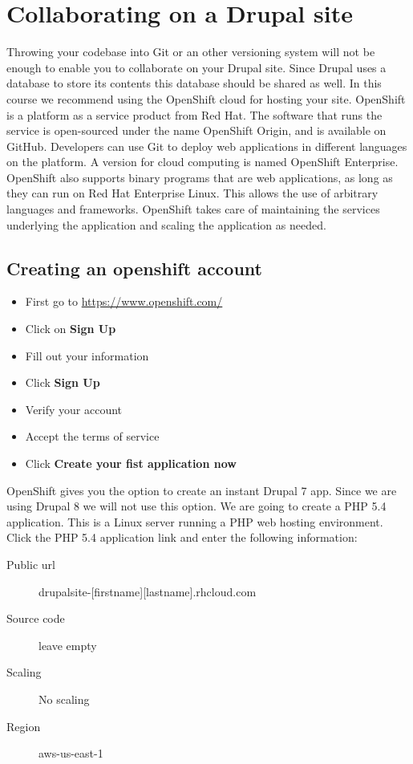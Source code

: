 \chapter{Collaborating on a Drupal site}

Throwing your codebase into Git or an other versioning system will not be enough to enable you to collaborate on your Drupal site. Since Drupal uses a database to store its contents this database should be shared as well. In this course we recommend using the OpenShift cloud for hosting your site.
OpenShift is a platform as a service product from Red Hat. The software that runs the service is open-sourced under the name OpenShift Origin, and is available on GitHub. Developers can use Git to deploy web applications in different languages on the platform. A version for cloud computing is named OpenShift Enterprise. OpenShift also supports binary programs that are web applications, as long as they can run on Red Hat Enterprise Linux. This allows the use of arbitrary languages and frameworks. OpenShift takes care of maintaining the services underlying the application and scaling the application as needed.

\section{Creating an openshift account}

\begin{itemize}
	\item First go to \url{https://www.openshift.com/}
	\item Click on \textbf{Sign Up}
	\item Fill out your information
	\item Click \textbf{Sign Up}
	\item Verify your account
	\item Accept the terms of service
	\item Click \textbf{Create your fist application now}
\end{itemize}

OpenShift gives you the option to create an instant Drupal 7 app. Since we are using Drupal 8 we will not use this option. We are going to create a PHP 5.4 application. This is a Linux server running a PHP web hosting environment. Click the PHP 5.4 application link and enter the following information:

\begin{description}
	\item[Public url] drupalsite-[firstname][lastname].rhcloud.com
	\item[Source code] leave empty
	\item[Scaling] No scaling
	\item[Region] aws-us-east-1
\end{description}


